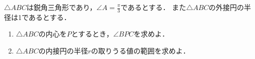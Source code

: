\documentclass[../../main.tex]{subfiles}
\begin{document}
$\triangle ABC$は鋭角三角形であり，$\displaystyle \angle A=\frac{\pi}{3}$であるとする．
また$\triangle ABC$の外接円の半径は1であるとする．
\begin{enumerate}
  \item$\triangle ABC$の内心を$P$とするとき，$\angle BPC$を求めよ．
  \item$\triangle ABC$の内接円の半径$r$の取りうる値の範囲を求めよ．
\end{enumerate}
\end{document}
